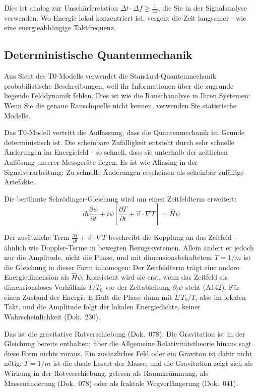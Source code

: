 Dies ist analog zur Unschärferelation $\Delta t \cdot \Delta f \geq \frac{1}{4\pi}$, die Sie in der Signalanalyse verwenden. Wo Energie lokal konzentriert ist, vergeht die Zeit langsamer - wie eine energieabhängige Taktfrequenz.

\subsection{Deterministische Quantenmechanik}

Aus Sicht des T0-Modells verwendet die Standard-Quantenmechanik probabilistische Beschreibungen, weil ihr Informationen über die zugrunde liegende Felddynamik fehlen. Dies ist wie die Rauschanalyse in Ihren Systemen: Wenn Sie die genaue Rauschquelle nicht kennen, verwenden Sie statistische Modelle.

Das T0-Modell vertritt die Auffassung, dass die Quantenmechanik im Grunde deterministisch ist. Die scheinbare Zufälligkeit entsteht durch sehr schnelle Änderungen im Energiefeld - so schnell, dass sie unterhalb der zeitlichen Auflösung unserer Messgeräte liegen. Es ist wie Aliasing in der Signalverarbeitung: Zu schnelle Änderungen erscheinen als scheinbar zufällige Artefakte.

Die berühmte Schrödinger-Gleichung wird um einen Zeitfeldterm erweitert:
$$i\hbar\frac{\partial\psi}{\partial t} + i\psi\left[\frac{\partial T}{\partial t} + \vec{v} \cdot \nabla T\right] = \hat{H}\psi$$

Der zusätzliche Term $\frac{\partial T}{\partial t} + \vec{v} \cdot \nabla T$ beschreibt die Kopplung an das Zeitfeld - ähnlich wie Doppler-Terme in bewegten Bezugssystemen. Allein ändert er jedoch nur die Amplitude, nicht die Phase, und mit dimensionsbehaftetem $T=1/m$ ist die Gleichung in dieser Form inhomogen: Der Zeitfeldterm trägt eine andere Energiedimension als $\hat H\psi$. Konsistent wird sie erst, wenn das Zeitfeld als dimensionsloses Verhältnis $T/T_0$ vor der Zeitableitung $\partial_t\psi$ steht (A142). Für einen Zustand der Energie $E$ läuft die Phase dann mit $E\,T_0/T$, also im lokalen Takt, und die Amplitude folgt der lokalen Energiedichte, keiner Wahrscheinlichkeit (Dok.~230).

Das ist die gravitative Rotverschiebung (Dok.~078): Die Gravitation ist in der Gleichung bereits enthalten; über die Allgemeine Relativitätstheorie hinaus sagt diese Form nichts voraus. Ein zusätzliches Feld oder ein Graviton ist dafür nicht nötig: $T=1/m$ ist die duale Lesart der Masse, und die Gravitation zeigt sich als Wirkung in der Rotverschiebung, gelesen als Raumkrümmung, als Massenänderung (Dok.~078) oder als fraktale Wegverlängerung (Dok.~041).
